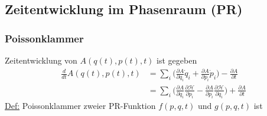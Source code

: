 \documentclass[titlepage,12pt,a4paper,ngerman]{report}
\newcommand{\ham}{\mathcal{H}}
\begin{document}
{%

\subsection{Zeitentwicklung im Phasenraum (PR)}
\subsubsection{Poissonklammer}
Zeitentwicklung von $ A(q(t) , p(t) , t) $ ist gegeben
\begin{align*}
\frac{d}{dt} A(q(t),p(t),t) &= \sum_i \bigg( \frac{\partial A}{\partial q_i} \dot{q}_i + \frac{\partial A}{\partial p_i} \dot{p}_i \bigg) - \frac{\partial A}{\partial t}\\
&= \sum_i \bigg( \frac{\partial A}{\partial q_i} \frac{\partial \ham}{\partial p_i} - \frac{\partial A}{\partial p_i} \frac{\partial \ham}{\partial q_i} \bigg) + \frac{\partial A}{\partial t}
\end{align*}
\underline{Def:} Poissonklammer zweier PR-Funktion $ f(p,q,t) $ und $ g(p,q,t) $ ist

}
\end{document}
